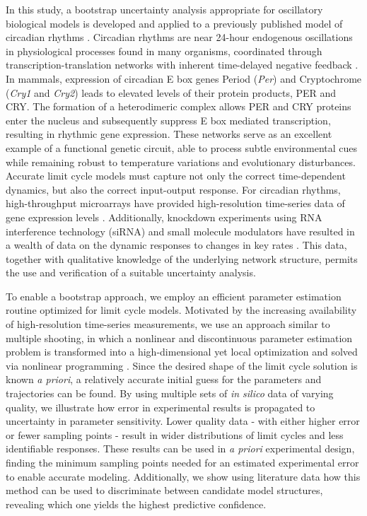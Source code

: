 In this study, a bootstrap uncertainty analysis appropriate for oscillatory
biological models is developed and applied to a previously published model of
circadian rhythms \cite{Hirota2012}. Circadian rhythms are near 24-hour
endogenous oscillations in physiological processes found in many organisms,
coordinated through transcription-translation networks with inherent
time-delayed negative feedback \cite{Ko2006, Doyleiii2006, Herzog2007}.  In
mammals, expression of circadian E box genes Period ({\itshape Per}) and
Cryptochrome ({\itshape Cry1} and {\itshape Cry2}) leads to elevated levels of
their protein products, PER and CRY. The formation of a heterodimeric complex
allows PER and CRY proteins enter the nucleus and subsequently suppress E box
mediated transcription, resulting in rhythmic gene expression. These networks
serve as an excellent example of a functional genetic circuit, able to process
subtle environmental cues while remaining robust to temperature variations and
evolutionary disturbances. Accurate limit cycle models must capture not only
the correct time-dependent dynamics, but also the correct input-output
response. For circadian rhythms, high-throughput microarrays have provided
high-resolution time-series data of gene expression levels \cite{Hughes2009}.
Additionally, knockdown experiments using RNA interference technology (siRNA)
and small molecule modulators have resulted in a wealth of data on the dynamic
responses to changes in key rates \cite{Zhang2009, Hirota2010, Hirota2008,
Hirota2012}.  This data, together with qualitative knowledge of the underlying
network structure, permits the use and verification of a suitable uncertainty
analysis.

To enable a bootstrap approach, we employ an efficient parameter estimation
routine optimized for limit cycle models. Motivated by the increasing
availability of high-resolution time-series measurements, we use an approach
similar to multiple shooting, in which a nonlinear and discontinuous parameter
estimation problem is transformed into a high-dimensional yet local
optimization and solved via nonlinear programming \cite{Biegler2010}. Since
the desired shape of the limit cycle solution is known {\itshape a priori}, a
relatively accurate initial guess for the parameters and trajectories can be
found. By using multiple sets of {\itshape in silico} data of varying quality,
we illustrate how error in experimental results is propagated to uncertainty in
parameter sensitivity. Lower quality data - with either higher error or fewer
sampling points - result in wider distributions of limit cycles and less
identifiable responses. These results can be used in {\itshape a priori}
experimental design, finding the minimum sampling points needed for an
estimated experimental error to enable accurate modeling. Additionally, we show
using literature data how this method can be used to discriminate between
candidate model structures, revealing which one yields the highest predictive
confidence. 

